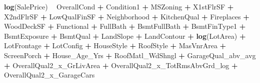\documentclass[
]{article}
\newenvironment{Shaded}{\begin{snugshade}}{\end{snugshade}}
\newcommand{\KeywordTok}[1]{\textcolor[rgb]{0.13,0.29,0.53}{\textbf{#1}}}
\newcommand{\NormalTok}[1]{#1}
\newcommand{\OperatorTok}[1]{\textcolor[rgb]{0.81,0.36,0.00}{\textbf{#1}}}
\newcommand{\StringTok}[1]{\textcolor[rgb]{0.31,0.60,0.02}{#1}}
\begin{document}
\begin{Shaded}
\begin{Highlighting}[]
\KeywordTok{log}\NormalTok{(SalePrice) }\OperatorTok{~}\StringTok{ }\NormalTok{OverallCond }\OperatorTok{+}\StringTok{ }\NormalTok{Condition1 }\OperatorTok{+}\StringTok{ }\NormalTok{MSZoning }\OperatorTok{+}\StringTok{ }\NormalTok{X1stFlrSF }\OperatorTok{+}\StringTok{ }\NormalTok{X2ndFlrSF }\OperatorTok{+}\StringTok{ }
\StringTok{  }\NormalTok{LowQualFinSF }\OperatorTok{+}\StringTok{ }\NormalTok{Neighborhood }\OperatorTok{+}\StringTok{ }\NormalTok{KitchenQual }\OperatorTok{+}\StringTok{ }\NormalTok{Fireplaces }\OperatorTok{+}\StringTok{ }\NormalTok{WoodDeckSF }\OperatorTok{+}\StringTok{ }
\StringTok{  }\NormalTok{Functional }\OperatorTok{+}\StringTok{ }\NormalTok{FullBath }\OperatorTok{+}\StringTok{ }\NormalTok{BsmtFullBath }\OperatorTok{+}\StringTok{ }\NormalTok{BsmtFinType1 }\OperatorTok{+}\StringTok{ }\NormalTok{BsmtExposure }\OperatorTok{+}\StringTok{ }\NormalTok{BsmtQual }\OperatorTok{+}
\StringTok{  }\NormalTok{LandSlope }\OperatorTok{+}\StringTok{ }\NormalTok{LandContour }\OperatorTok{+}\StringTok{ }\KeywordTok{log}\NormalTok{(LotArea) }\OperatorTok{+}\StringTok{ }\NormalTok{LotFrontage }\OperatorTok{+}\StringTok{ }\NormalTok{LotConfig }\OperatorTok{+}\StringTok{ }\NormalTok{HouseStyle }\OperatorTok{+}\StringTok{ }
\StringTok{  }\NormalTok{RoofStyle }\OperatorTok{+}\StringTok{ }\NormalTok{MasVnrArea }\OperatorTok{+}\StringTok{ }\NormalTok{ScreenPorch }\OperatorTok{+}\StringTok{ }\NormalTok{House_Age_Yrs }\OperatorTok{+}\StringTok{ }\NormalTok{RoofMatl_WdShngl }\OperatorTok{+}
\StringTok{  }\NormalTok{GarageQual_abv_avg }\OperatorTok{+}\StringTok{ }\NormalTok{OverallQual2_x_GrLivArea }\OperatorTok{+}\StringTok{ }\NormalTok{OverallQual2_x_TotRmsAbvGrd_log }\OperatorTok{+}\StringTok{ }
\StringTok{  }\NormalTok{OverallQual2_x_GarageCars}
\end{Highlighting}
\end{Shaded}
\end{document}
